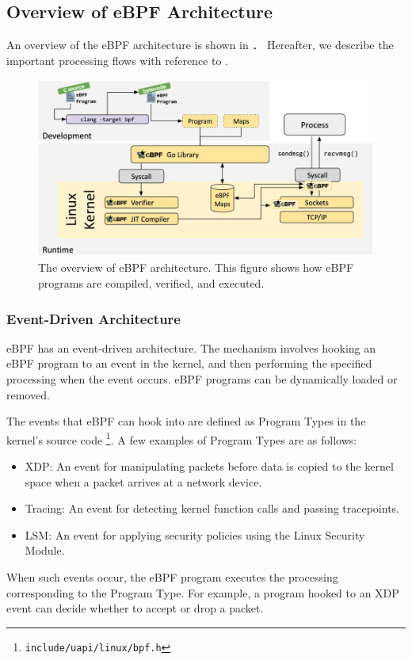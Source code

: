 \subsection{Overview of eBPF Architecture}
An overview of the eBPF architecture is shown in ．
Hereafter, we describe the important processing flows with reference to .
\begin{figure}[tp]
  \begin{center}
    \includegraphics[width=\columnwidth]{./img/ebpf_system.png}
  \end{center}
  \caption{The overview of eBPF architecture. This figure shows how eBPF programs are compiled, verified, and executed.
    \cite{WhatiseB29:online}}
  \label{img:ebpf-system}
\end{figure}

\subsubsection{Event-Driven Architecture}

eBPF has an event-driven architecture.
The mechanism involves hooking an eBPF program to an event in the kernel, and then
performing the specified processing when the event occurs. eBPF programs can be dynamically loaded or removed.

The events that eBPF can hook into are defined as Program Types in the kernel's source code \footnote{\texttt{include/uapi/linux/bpf.h}}.
A few examples of Program Types are as follows:
\begin{itemize}
  \item XDP: An event for manipulating packets before data is copied to the kernel space when a packet arrives at a network device.
  \item Tracing: An event for detecting kernel function calls and passing tracepoints.
  \item LSM: An event for applying security policies using the Linux Security Module.
\end{itemize}
When such events occur, the eBPF program executes the processing corresponding to the Program Type.
For example, a program hooked to an XDP event can decide whether to accept or drop a packet.

